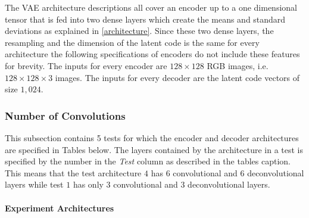 The VAE architecture descriptions all cover an encoder up to a one dimensional tensor that is fed into two dense
layers which create the means and standard deviations as explained in \autoref{architecture}. Since these two
dense layers, the resampling and the dimension of the latent code is the same for every architecture the following
specifications of encoders do not include these features for brevity.
The inputs for every encoder are $128\times 128$ RGB images, i.e. $128\times 128\times 3$ images. The inputs
for every decoder are the latent code vectors of size $1,024$.


\subsubsection{Number of Convolutions} \label{section_number_of_convolutions_experiment}

This subsection contains 5 tests for which the encoder and decoder architectures are specified in Tables below.
The layers contained by the architecture in a test is specified by the number in the \textit{Test} column as 
described in the tables caption. This means that the test architecture $4$ has $6$ convolutional and
$6$ deconvolutional layers while test $1$ has only $3$ convolutional and $3$ deconvolutional
layers.

\paragraph{Experiment Architectures}

